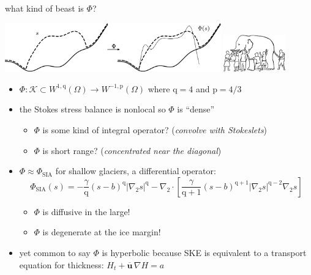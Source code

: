 \documentclass[usepdftitle=false]{beamer}
\newcommand{\grad}{\nabla}
\newcommand{\bu}{\mathbf{u}}
\newcommand{\pp}{{\text{p}}}
\newcommand{\qq}{{\text{q}}}
\begin{document}
\begin{frame}{what kind of beast is $\Phi$?}

\begin{center}
\includegraphics[width=0.7\textwidth]{figs/idoaction.png} \hfill \includegraphics[width=0.2\textwidth]{figs/elephant.png}
\end{center}

\begin{itemize}
\small
\item $\Phi : \mathcal{K} \subset W^{1,\qq}(\Omega) \to W^{-1,\pp}(\Omega)$ where $\qq=4$ and $\pp=4/3$
\item the Stokes stress balance is nonlocal so $\Phi$ is ``dense''
    \begin{itemize}
    \item $\Phi$ is some kind of integral operator? (\emph{convolve with Stokeslets})
    \item $\Phi$ is short range? (\emph{concentrated near the diagonal})
    \end{itemize}
\item $\Phi \approx \Phi_{\text{SIA}}$ for shallow glaciers, a differential operator:
    $$\Phi_{\text{SIA}}(s) = - \frac{\gamma}{\qq} (s-b)^{\qq} |\grad_2 s|^{\qq} - \grad_2 \cdot\left[\frac{\gamma}{\qq+1} (s-b)^{\qq+1} |\grad_2 s|^{\qq-2} \grad_2 s\right]$$

    \begin{itemize}
    \item $\Phi$ is diffusive in the large!
    \item $\Phi$ is degenerate at the ice margin!
    \end{itemize}
\item yet common to say $\Phi$ is hyperbolic because SKE is equivalent to a transport equation for thickness: $H_t + \overline{\bu}\, \grad H = a$
\end{itemize}
\end{frame}
\end{document}
